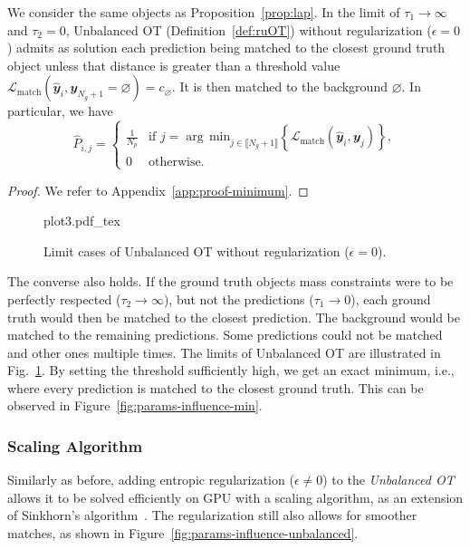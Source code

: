 \begin{proposition}
\label{prop:threshold}
We consider the same objects as Proposition~\ref{prop:lap}. In the limit of $\tau_1 \rightarrow \infty$ and $\tau_2 = 0$, Unbalanced OT (Definition~\ref{def:ruOT}) without regularization ($\epsilon = 0$) admits as solution each prediction being matched to the closest ground truth object unless that distance is greater than a threshold value $\mathcal{L}_{\text{match}}\left(\hat{\mathbfit{y}}_i,\mathbfit{y}_{N_g+1}=\varnothing\right) = c_{\varnothing}$. It is then matched to the background $\varnothing$. In particular, we have
\begin{equation}
    \hat{P}_{i,j} = \left\{
    \begin{array}{ll}
        \frac{1}{N_p} & \text{if } j = \mathrm{\arg\, min}_{j \in \llbracket N_g+1 \rrbracket}\left\{\mathcal{L}_{\text{match}}\left(\hat{\mathbfit{y}}_i, \mathbfit{y}_j \right)\right\},\\
        0 & \text{otherwise}.
    \end{array}\right.
\end{equation}
\end{proposition}
\begin{proof}
    We refer to Appendix~\ref{app:proof-minimum}.
\end{proof}

\begin{figure}[h]
    \centering \footnotesize
    {plot3.pdf_tex}
    \vspace{-.5em}
    \caption{\label{fig:unbalanced-limits}Limit cases of Unbalanced OT without regularization ($\epsilon=0$).}
\end{figure}


The converse also holds. If the ground truth objects mass constraints were to be perfectly respected ($\tau_2 \rightarrow \infty$), but not the predictions ($\tau_1 \rightarrow 0$), each ground truth would then be matched to the closest prediction. The background would be matched to the remaining predictions. Some predictions could not be matched and other ones multiple times. The limits of Unbalanced OT are illustrated in Fig.~\ref{fig:unbalanced-limits}. By setting the threshold sufficiently high, we get an exact minimum, i.e., where every prediction is matched to the closest ground truth. This can be observed in Figure~\ref{fig:params-influence-min}.

\subsubsection{Scaling Algorithm}
Similarly as before, adding entropic regularization ($\epsilon \neq 0$) to the \emph{Unbalanced OT} allows it to be solved efficiently on GPU with a scaling algorithm, as an extension of Sinkhorn's algorithm~\cite{chizat2018scaling, chizat-these}. The regularization still also allows for smoother matches, as shown in Figure~\ref{fig:params-influence-unbalanced}.


